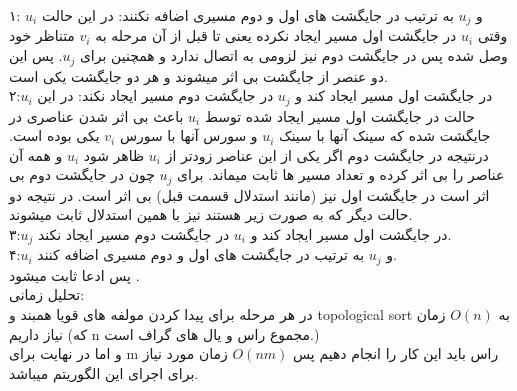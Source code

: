  ۱: $u_i$ و $u_j$ به ترتیب در جایگشت های اول و دوم
 مسیری اضافه نکنند:
  در این حالت وقتی $u_i$ در جایگشت 
 اول مسیر ایجاد نکرده یعنی تا قبل از آن مرحله به $v_i$ متناظر خود
 وصل شده پس در جایگشت دوم نیز لزومی به اتصال ندارد و همچنین برای
 $u_j$. پس این دو عنصر از جایگشت بی اثر میشوند و هر دو جایگشت یکی است.
 \\
 ۲:$u_i$ در جایگشت اول مسیر ایجاد کند و $u_j$ در جایگشت دوم
 مسیر ایجاد نکند:
در این حالت در جایگشت اول مسیر ایجاد شده توسط $u_i$ باعث بی اثر شدن
عناصری در جایگشت شده که سینک آنها با سینک $u_i$ و سورس آنها با سورس $v_i$
یکی بوده است. درنتیجه 
در جایگشت دوم اگر یکی از این عناصر زودتر از $u_i$ ظاهر شود
$u_i$ و همه آن عناصر را بی اثر کرده
و تعداد مسیر ها ثابت میماند.
برای $u_j$ چون در جایگشت دوم بی اثر است در جایگشت اول نیز (مانند استدلال قسمت قبل)
بی اثر است.
در نتیجه دو حالت دیگر که به صورت زیر هستند نیز با همین استدلال ثابت میشوند.
\\
۳:$u_j$ در جایگشت اول مسیر ایجاد کند و $u_i$ در جایگشت دوم
 مسیر ایجاد نکند.
\\ 
۴:$u_i$ و $u_j$ به ترتیب در جایگشت های اول و دوم
مسیری اضافه کنند.\\
پس ادعا ثابت میشود .
\\ تحلیل زمانی:\\
در هر مرحله برای پیدا کردن مولفه های قویا همبند و topological sort به $O(n)$ زمان نیاز داریم
(که n مجموع راس و یال های گراف است.)\\
و اما در نهایت برای m راس باید این کار را انجام دهیم پس
$O(nm)$ زمان مورد نیاز برای اجرای این الگوریتم میباشد.







